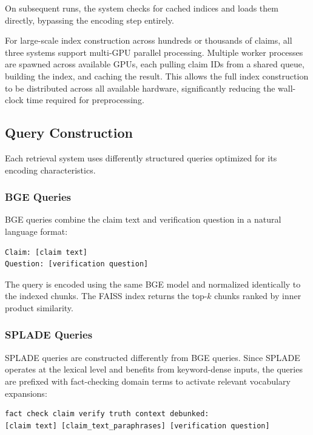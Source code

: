 On subsequent runs, the system checks for cached indices and loads them directly, bypassing the encoding step entirely.

For large-scale index construction across hundreds or thousands of claims, all three systems support multi-GPU parallel processing. Multiple worker processes are spawned across available GPUs, each pulling claim IDs from a shared queue, building the index, and caching the result. This allows the full index construction to be distributed across all available hardware, significantly reducing the wall-clock time required for preprocessing.

\subsection{Query Construction}
\label{ch:queryConstruction}

Each retrieval system uses differently structured queries optimized for its encoding characteristics.

\subsubsection{BGE Queries}

BGE queries combine the claim text and verification question in a natural language format:

\begin{verbatim}
Claim: [claim text]
Question: [verification question]
\end{verbatim}

The query is encoded using the same BGE model and normalized identically to the indexed chunks. The FAISS index returns the top-$k$ chunks ranked by inner product similarity.

\subsubsection{SPLADE Queries}

SPLADE queries are constructed differently from BGE queries. Since SPLADE operates at the lexical level and benefits from keyword-dense inputs, the queries are prefixed with fact-checking domain terms to activate relevant vocabulary expansions:

\begin{verbatim}
fact check claim verify truth context debunked:
[claim text] [claim_text_paraphrases] [verification question]
\end{verbatim}

